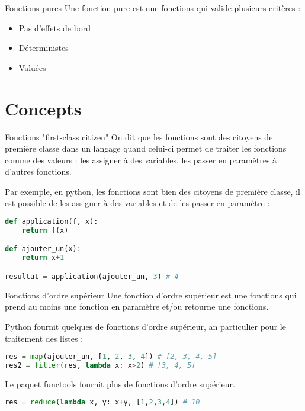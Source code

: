 \documentclass[aspectratio=169]{beamer}
\begin{document}
\begin{frame}{Fonctions pures}
    Une fonction pure est une fonctions qui valide plusieurs critères :
    \begin{itemize}
        \item Pas d'effets de bord
        \item Déterministes
        \item Valuées
    \end{itemize}
    
\end{frame}

\section{Concepts}

\begin{frame}[fragile]{Fonctions "first-class citizen"}
    On dit que les fonctions sont des citoyens de première classe dans un langage quand celui-ci permet de traiter les fonctions comme des valeurs : les assigner à des variables, les passer en paramètres à d'autres fonctions.

    Par exemple, en python, les fonctions sont bien des citoyens de première classe, il est possible de les assigner à des variables et de les passer en paramètre :

    \begin{lstlisting}[language=Python]
def application(f, x):
    return f(x)

def ajouter_un(x):
    return x+1

resultat = application(ajouter_un, 3) # 4
    \end{lstlisting}
\end{frame}

\begin{frame}[fragile]{Fonctions d'ordre supérieur}
    Une fonction d'ordre supérieur est une fonctions qui prend au moins une fonction en paramètre et/ou retourne une fonctions.

    Python fournit quelques de fonctions d'ordre supérieur, an particulier pour le traitement des listes :

    \begin{lstlisting}[language=Python]
res = map(ajouter_un, [1, 2, 3, 4]) # [2, 3, 4, 5]
res2 = filter(res, lambda x: x>2) # [3, 4, 5]
    \end{lstlisting}

    Le paquet functools fournit plus de fonctions d'ordre supérieur.

      \begin{lstlisting}[language=Python]
res = reduce(lambda x, y: x+y, [1,2,3,4]) # 10
    \end{lstlisting}  
\end{frame}
\end{document}
